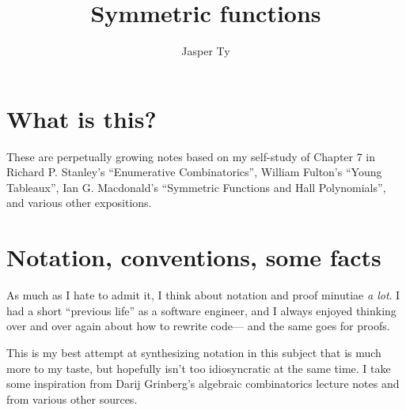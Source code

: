 \documentclass{article}
\title{Symmetric functions}
\author{Jasper Ty}
\date{}
\begin{document}
\maketitle

\section*{What is this?}

These are perpetually growing notes based on my self-study of Chapter 7 in Richard P. Stanley's ``Enumerative Combinatorics'', William Fulton's ``Young Tableaux'', Ian G. Macdonald's ``Symmetric Functions and Hall Polynomials'', and various other expositions. 

\tableofcontents

\section*{Notation, conventions, some facts}

\iffalse
As much as I hate to admit it, I think about notation and proof minutiae \textit{a lot}.
I had a short ``previous life'' as a software engineer, and I always enjoyed thinking over and over again about how to rewrite code--- and the same goes for proofs.

This is my best attempt at synthesizing notation in this subject that is much more to my taste, but hopefully isn't too idiosyncratic at the same time.
I take some inspiration from Darij Grinberg's algebraic combinatorics lecture notes \cite{DarijAC} and from various other sources.
\end{document}
